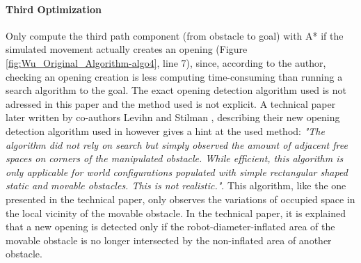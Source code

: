 \paragraph{Third Optimization}\label{optimization_3} Only compute the third path component (from obstacle to goal) with A* if the simulated movement actually creates an opening (Figure \ref{fig:Wu_Original_Algorithm-algo4}, line 7), since, according to the author, checking an opening creation is less computing time-consuming than running a search algorithm to the goal. The exact opening detection algorithm used is not adressed in this paper and the method used is not explicit. A technical paper later written by co-authors Levihn and Stilman \parencite{levihn_efficient_2011}, describing their new opening detection algorithm used in \parencite{levihn_locally_2014} however gives a hint at the used method: \textit{"The algorithm did not rely on search but simply observed the amount of adjacent free spaces on corners of the manipulated obstacle. While efficient, this algorithm is only applicable for world configurations populated with simple rectangular shaped static and movable obstacles. This is not realistic."}. This algorithm, like the one presented in the technical paper, only observes the variations of occupied space in the local vicinity of the movable obstacle. In the technical paper, it is explained that a new opening is detected only if the robot-diameter-inflated area of the movable obstacle is no longer intersected by the non-inflated area of another obstacle.

\clearpage

